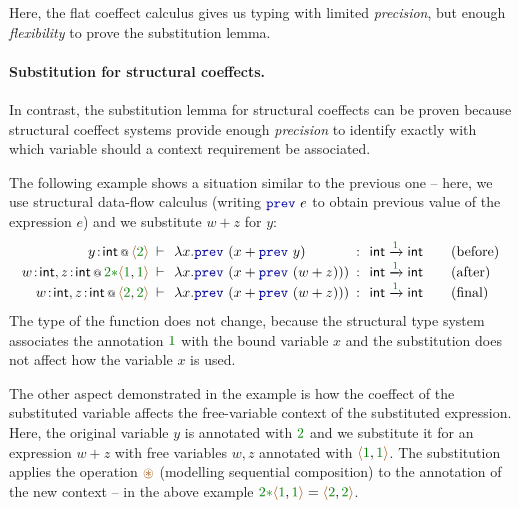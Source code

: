 Here, the flat coeffect calculus gives us typing with limited \emph{precision}, but 
enough \emph{flexibility} to prove the substitution lemma.

\paragraph{Substitution for structural coeffects.}
In contrast, the substitution lemma for structural coeffects can be proven because 
structural coeffect systems provide enough \emph{precision} to identify exactly with 
which variable should a context requirement be associated.

The following example shows a situation similar to the previous one -- here, we use
structural data-flow calculus (writing $\kvd{prev}~e$ to obtain previous value of the 
expression $e$) and we substitute $w+z$ for $y$:
%
\begin{equation*}
\begin{array}{rclcll}
 \coctx{y\!:\!\ident{int}}{ \alift{\cclrd{2}} } 
  &\narrow{\vdash}& \lambda x.\kvd{prev}~(x + \kvd{prev}~y) &\narrow{:}&
   \ident{int} \xrightarrow{\cclrd{ 1 }} \ident{int} & \quad(\textnormal{before}) \\
\coctx{w\!:\!\ident{int}, z\!:\!\ident{int}}{\cclrd{2}\cclrd{\ast}\alift{\cclrd{1},\cclrd{1}}} 
  &\narrow{\vdash}& \lambda x.\kvd{prev}~(x + \kvd{prev}~(w+z))) &\narrow{:}&
   \ident{int} \xrightarrow{\cclrd{ 1 }} \ident{int} & \quad(\textnormal{after}) \\
\coctx{w\!:\!\ident{int}, z\!:\!\ident{int}}{\alift{\cclrd{2},\cclrd{2}}} 
  &\narrow{\vdash}& \lambda x.\kvd{prev}~(x + \kvd{prev}~(w+z))) &\narrow{:}&
   \ident{int} \xrightarrow{\cclrd{ 1 }} \ident{int} & \quad(\textnormal{final})
\end{array}  
\end{equation*}
%
The type of the function does not change, because the structural type system associates
the annotation $\cclrd{1}$ with the bound variable $x$ and the substitution does not 
affect how the variable $x$ is used.

The other aspect demonstrated in the example is how the coeffect of the substituted 
variable affects the free-variable context of the substituted expression. Here, the
original variable $y$ is annotated with $\cclrd{2}$ and we substitute it for an
expression $w+z$ with free variables $w,z$ annotated with $\alift{\cclrd{1}, \cclrd{1}}$.
The substitution applies the operation $\aseq$ (modelling sequential composition) to 
the annotation of the new context -- in the above example
$\cclrd{2}\cclrd{\ast}\alift{\cclrd{1}, \cclrd{1}}=\alift{\cclrd{2}, \cclrd{2}}$.

